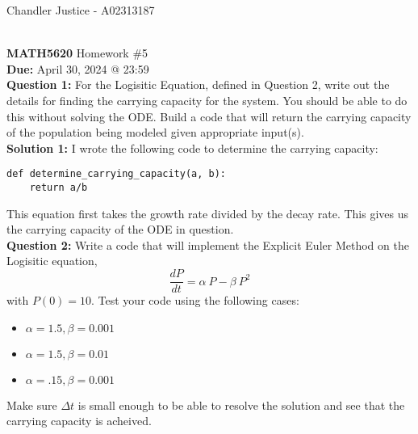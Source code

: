 \documentclass[10pt]{article}
\newcommand{\1}{\mathbb{1}}
\begin{document}
\begin{flushright}
Chandler Justice - A02313187
\end{flushright}
\noindent \underline{\hspace{3in}}\\
\textbf{MATH5620} Homework \#5 \\
\textbf{Due:} April 30, 2024 @ 23:59\\

\textbf{Question 1:} For the Logisitic Equation, defined in Question 2, write out the details for finding the carrying capacity for the system. You should be able to do this without solving the ODE. Build a code that will return the carrying capacity of the population being modeled given appropriate input(s).\\

\textbf{Solution 1:} I wrote the following code to determine the carrying capacity:
\begin{verbatim}
def determine_carrying_capacity(a, b):
    return a/b
\end{verbatim}
This equation first takes the growth rate divided by the decay rate. This gives us the carrying capacity of the ODE in question.\\

\textbf{Question 2:} Write a code that will implement the Explicit Euler Method on the Logisitic equation, $$ \frac{dP}{dt} = \alpha\ P - \beta\ P^2 $$ with $P(0) = 10$. Test your code using the following cases:
\begin{itemize}
    \item $\alpha = 1.5, \beta = 0.001$\\
    \item $\alpha = 1.5, \beta = 0.01$\\
    \item $\alpha = .15, \beta = 0.001$\\
\end{itemize}
Make sure $\Delta t$ is small enough to be able to resolve the solution and see that the carrying capacity is acheived.\\
\end{document}

